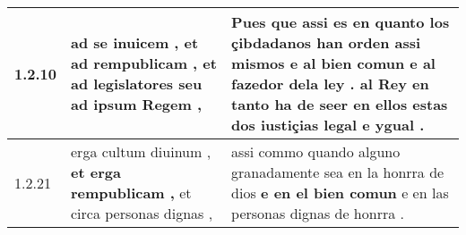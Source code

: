 \begin{tabular}{|p{1cm}|p{6.5cm}|p{6.5cm}|}

\hline
1.2.10 & ad se inuicem , \textbf{ et ad rempublicam , } et ad legislatores seu ad ipsum Regem , & Pues que assi es en quanto los çibdadanos han orden assi mismos \textbf{ e al bien comun e al fazedor dela ley . } al Rey en tanto ha de seer en ellos estas dos iustiçias legal e ygual . \\\hline
1.2.21 & erga cultum diuinum , \textbf{ et erga rempublicam , } et circa personas dignas , & assi commo quando alguno granadamente sea en la honrra de dios \textbf{ e en el bien comun } e en las personas dignas de honrra . \\\hline

\end{tabular}
